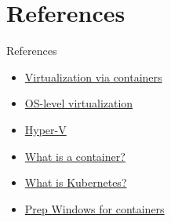 

\section{References}\label{sec:references}

\begin{frame}{References}
    \begin{itemize}
        \item \href{https://insights.sei.cmu.edu/sei_blog/2017/09/virtualization-via-containers.html}{Virtualization via containers}
        \item \href{https://en.wikipedia.org/wiki/OS-level_virtualization}{OS-level virtualization}
        \item \href{https://en.wikipedia.org/wiki/Hyper-V}{Hyper-V}
        \item \href{https://www.docker.com/resources/what-container}{What is a container?}
        \item \href{https://kubernetes.io/docs/concepts/overview/what-is-kubernetes/}{What is Kubernetes?}
        \item \href{https://docs.microsoft.com/en-us/virtualization/windowscontainers/quick-start/set-up-environment?tabs=Windows-10-Client}{Prep Windows for containers}
    \end{itemize}
\end{frame}
